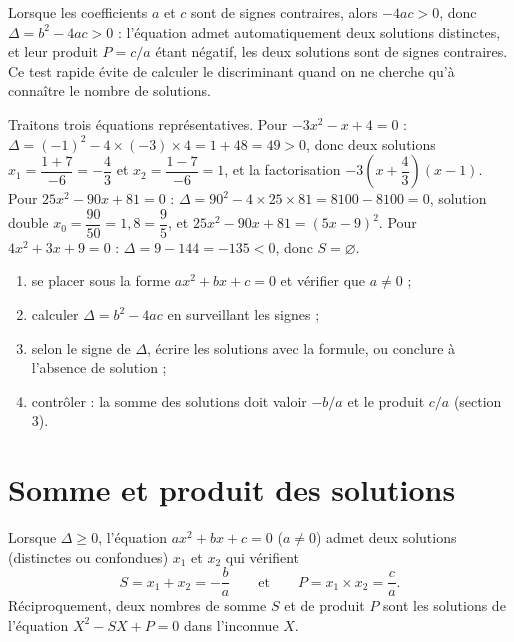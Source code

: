 \begin{remarque}
Lorsque les coefficients $a$ et $c$ sont de signes contraires, alors $-4ac > 0$, donc $\Delta = b^{2} - 4ac > 0$ : l'équation admet automatiquement deux solutions distinctes, et leur produit $P = c/a$ étant négatif, les deux solutions sont de signes contraires. Ce test rapide évite de calculer le discriminant quand on ne cherche qu'à connaître le nombre de solutions.
\end{remarque}

\begin{exemple}
Traitons trois équations représentatives. Pour $-3x^{2} - x + 4 = 0$ : $\Delta = (-1)^{2} - 4 \times (-3) \times 4 = 1 + 48 = 49 > 0$, donc deux solutions $x_{1} = \dfrac{1 + 7}{-6} = -\dfrac{4}{3}$ et $x_{2} = \dfrac{1 - 7}{-6} = 1$, et la factorisation $-3\left(x + \dfrac{4}{3}\right)(x - 1)$. Pour $25x^{2} - 90x + 81 = 0$ : $\Delta = 90^{2} - 4 \times 25 \times 81 = 8100 - 8100 = 0$, solution double $x_{0} = \dfrac{90}{50} = 1{,}8 = \dfrac{9}{5}$, et $25x^{2} - 90x + 81 = (5x - 9)^{2}$. Pour $4x^{2} + 3x + 9 = 0$ : $\Delta = 9 - 144 = -135 < 0$, donc $S = \varnothing$.
\end{exemple}

\begin{methode}
\begin{enumerate}
  \item se placer sous la forme $ax^{2} + bx + c = 0$ et vérifier que $a \neq 0$ ;
  \item calculer $\Delta = b^{2} - 4ac$ en surveillant les signes ;
  \item selon le signe de $\Delta$, écrire les solutions avec la formule, ou conclure à l'absence de solution ;
  \item contrôler : la somme des solutions doit valoir $-b/a$ et le produit $c/a$ (section 3).
\end{enumerate}
\end{methode}

\section{Somme et produit des solutions}

\begin{propriete}
Lorsque $\Delta \geq 0$, l'équation $ax^{2} + bx + c = 0$ ($a \neq 0$) admet deux solutions (distinctes ou confondues) $x_{1}$ et $x_{2}$ qui vérifient
\[
S = x_{1} + x_{2} = -\frac{b}{a} \qquad\text{et}\qquad
P = x_{1} \times x_{2} = \frac{c}{a}.
\]
Réciproquement, deux nombres de somme $S$ et de produit $P$ sont les solutions de l'équation $X^{2} - S X + P = 0$ dans l'inconnue $X$.
\end{propriete}

